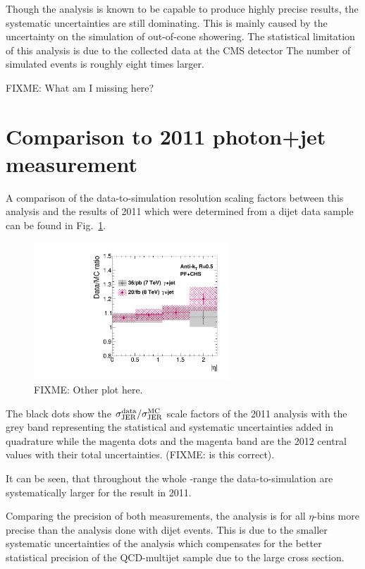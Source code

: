 Though the \GAMJET analysis is known to be capable to produce highly precise results, the systematic uncertainties are still dominating. 
This is mainly caused by the uncertainty on the simulation of out-of-cone showering.
The statistical limitation of this analysis is due to the collected data at the CMS detector
The number of simulated events is roughly eight times larger.

FIXME: What am I missing here?
 
\section{Comparison to 2011 photon+jet measurement}
\label{res:sec:comparison_2010}

A comparison of the data-to-simulation resolution scaling factors between this analysis and the results of 2011 which were determined from a dijet data sample~\cite{bib:Matthias_Thesis} can be found in Fig.~\ref{res:fig:Comparison_2011}.
\begin{figure}[!b]
 \centering
    \includegraphics[width=0.65\textwidth]{figures/resolution/results/ComparisonTo2012_GAMJET.pdf}
  \caption{FIXME: Other plot here.}
  \label{res:fig:Comparison_2011}
\end{figure}

The black dots show the $\sigma_\mathrm{JER}^{\text{data}}/\sigma_\mathrm{JER}^{\text{MC}}$ scale factors of the 2011 analysis with the grey band representing the statistical and systematic uncertainties added in quadrature while the magenta dots and the magenta band
are the 2012 central values with their total uncertainties. (FIXME: is this correct).

It can be seen, that throughout the whole \etajet-range the data-to-simulation are systematically larger for the result in 2011. 

Comparing the precision of both measurements, the \GAMJET analysis is for all $\eta$-bins more precise than the analysis done with dijet events.
This is due to the smaller systematic uncertainties of the \GAMJET analysis which compensates for the better statistical precision of the QCD-multijet sample due to the large 
cross section.

